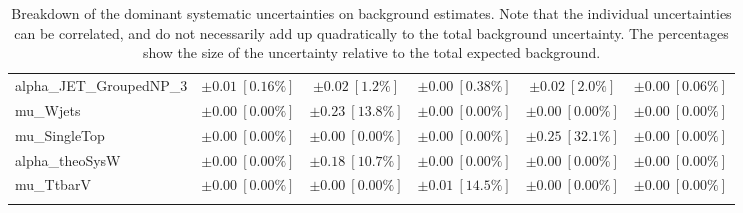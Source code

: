 \begin{sidewaystable}
\begin{center}
\begin{tabular*}{\textwidth}{@{\extracolsep{\fill}}lccccc}
alpha\_JET\_GroupedNP\_3         & $\pm 0.01\ [0.16\%] $          & $\pm 0.02\ [1.2\%] $          & $\pm 0.00\ [0.38\%] $          & $\pm 0.02\ [2.0\%] $          & $\pm 0.00\ [0.06\%] $       \\
mu\_Wjets         & $\pm 0.00\ [0.00\%] $          & $\pm 0.23\ [13.8\%] $          & $\pm 0.00\ [0.00\%] $          & $\pm 0.00\ [0.00\%] $          & $\pm 0.00\ [0.00\%] $       \\
mu\_SingleTop         & $\pm 0.00\ [0.00\%] $          & $\pm 0.00\ [0.00\%] $          & $\pm 0.00\ [0.00\%] $          & $\pm 0.25\ [32.1\%] $          & $\pm 0.00\ [0.00\%] $       \\
alpha\_theoSysW         & $\pm 0.00\ [0.00\%] $          & $\pm 0.18\ [10.7\%] $          & $\pm 0.00\ [0.00\%] $          & $\pm 0.00\ [0.00\%] $          & $\pm 0.00\ [0.00\%] $       \\
mu\_TtbarV         & $\pm 0.00\ [0.00\%] $          & $\pm 0.00\ [0.00\%] $          & $\pm 0.01\ [14.5\%] $          & $\pm 0.00\ [0.00\%] $          & $\pm 0.00\ [0.00\%] $       \\
\noalign{\smallskip}\hline\noalign{\smallskip}
\end{tabular*}
\end{center}
\caption[Breakdown of uncertainty on background estimates]{
Breakdown of the dominant systematic uncertainties on background estimates.
Note that the individual uncertainties can be correlated, and do not necessarily add up quadratically to 
the total background uncertainty. The percentages show the size of the uncertainty relative to the total expected background.
\label{table.results.bkgestimate.uncertainties.SRC4_bybkg}}
\end{sidewaystable}
%
